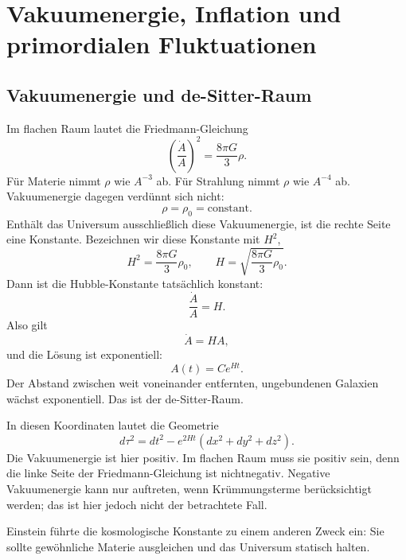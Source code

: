 \chapter{Vakuumenergie, Inflation und primordialen Fluktuationen}

\section{Vakuumenergie und de-Sitter-Raum}

Im flachen Raum lautet die Friedmann-Gleichung
\begin{equation}
\left(\frac{\dot A}{A}\right)^2=\frac{8\pi G}{3}\rho.
\end{equation}
Für Materie nimmt \(\rho\) wie \(A^{-3}\) ab. Für Strahlung nimmt \(\rho\) wie \(A^{-4}\) ab. Vakuumenergie dagegen verdünnt sich nicht:
\begin{equation}
\rho=\rho_0=\text{constant}.
\end{equation}
Enthält das Universum ausschließlich diese Vakuumenergie, ist die rechte Seite eine Konstante. Bezeichnen wir diese Konstante mit \(H^2\),
\begin{equation}
H^2=\frac{8\pi G}{3}\rho_0,
\qquad
H=\sqrt{\frac{8\pi G}{3}\rho_0}.
\end{equation}
Dann ist die Hubble-Konstante tatsächlich konstant:
\begin{equation}
\frac{\dot A}{A}=H.
\end{equation}
Also gilt
\begin{equation}
\dot A=HA,
\end{equation}
und die Lösung ist exponentiell:
\begin{equation}
A(t)=C e^{Ht}.
\end{equation}
Der Abstand zwischen weit voneinander entfernten, ungebundenen Galaxien wächst exponentiell. Das ist der de-Sitter-Raum.

In diesen Koordinaten lautet die Geometrie
\begin{equation}
d\tau^2=dt^2-e^{2Ht}\left(dx^2+dy^2+dz^2\right).
\end{equation}
Die Vakuumenergie ist hier positiv. Im flachen Raum muss sie positiv sein, denn die linke Seite der Friedmann-Gleichung ist nichtnegativ. Negative Vakuumenergie kann nur auftreten, wenn Krümmungsterme berücksichtigt werden; das ist hier jedoch nicht der betrachtete Fall.

Einstein führte die kosmologische Konstante zu einem anderen Zweck ein: Sie sollte gewöhnliche Materie ausgleichen und das Universum statisch halten.

